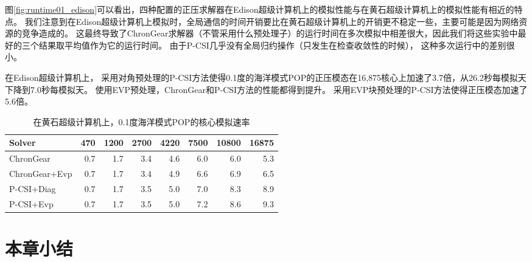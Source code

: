 图\ref{fig:runtime01_edison}可以看出，四种配置的正压求解器在Edison超级计算机上的模拟性能与在黄石超级计算机上的模拟性能有相近的特点。 
我们注意到在Edison超级计算机上模拟时，全局通信的时间开销要比在黄石超级计算机上的开销更不稳定一些，主要可能是因为网络资源的竞争造成的\cite{wang2014}。 
这最终导致了ChronGear求解器（不管采用什么预处理子）的运行时间在多次模拟中相差很大，因此我们将这些实验中最好的三个结果取平均值作为它的运行时间。 
由于P-CSI几乎没有全局归约操作（只发生在检查收敛性的时候）， 这种多次运行中的差别很小。 

 
在Edison超级计算机上， 采用对角预处理的P-CSI方法使得0.1度的海洋模式POP的正压模态在16,875核心上加速了3.7倍，从26.2秒每模拟天下降到7.0秒每模拟天。 
使用EVP预处理，ChronGear和P-CSI方法的性能都得到提升。 
采用EVP块预处理的P-CSI方法使得正压模态加速了5.6倍。 
 
 
\begin{table}
\begin{center}
\caption {在黄石超级计算机上，0.1度海洋模式POP的核心模拟速率\label{tab:improve_01}}
\begin{tabular}{|l||r|r|r|r|r|r|r|}
\hline
Solver & 470  & 1200   & 2700 & 4220 & 7500 & 10800 & 16875\\\hline
\hline
ChronGear     &0.7 &1.7&3.4  &4.6 &6.0 &6.0 &5.3\\\hline
ChronGear+Evp &0.7 &1.7&3.4  &4.9 &6.6 &6.9 &6.5\\\hline
P-CSI+Diag    &0.7 &1.7&3.5  &5.0 &7.0 &8.3 &8.9\\\hline
P-CSI+Evp     &0.7 &1.7&3.5  &5.0 &7.2 &8.6 &9.3\\
\hline
\end{tabular}
\end{center}
\end{table}

\section{本章小结}
\label{precond:Conclusion}
